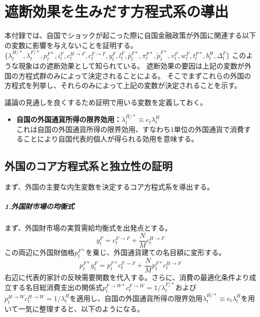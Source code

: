 
\chapter{遮断効果を生みだす方程式系の導出}
\label{chap:appendix_insulation_effect}

本付録では、自国でショックが起こった際に自国金融政策が外国に関連する以下の変数に影響を与えないことを証明する。
\(\{\lambda_t^{H/*},\lambda_t^{F/*},p_t^{F*},i_t^F,c_t^{H\to F},c_t^{F\to F},y_t^F,l_t^F,\bar{p}_t^{F*},\pi_t^{F*},\widetilde{p}_t^{F*},v_t^F,w_t^F,t_t^{F*},b_t^H,\Delta_t^F\}\)
このような現象は\textcite{ColeObstfeld1991}の遮断効果として知られている。
遮断効果の要因は上記の変数が外国の方程式群のみによって決定されることによる。
そこでまずこれらの外国の方程式を列挙し、それらのみによって上記の変数が決定されることを示す。

議論の見通しを良くするため証明で用いる変数を定義しておく。
\begin{itemize}
    \item\label{itm:appendix_insulation_effect_def_lambda_star} \textbf{自国の外国通貨所得の限界効用：}\(\lambda_t^{H/*}\equiv e_t\lambda_t^H\)\\
    これは自国の外国通貨所得の限界効用、すなわち1単位の外国通貨で消費することにより自国代表的個人が得られる効用を意味する。
\end{itemize}

\section{外国のコア方程式系と独立性の証明}
\label{sec:appendix_insulation_effect_core}

まず、外国の主要な内生変数を決定するコア方程式系を導出する。



\paragraph{1.外国財市場の均衡式}
\label{sec:appendix_insulation_effect_core_market_clearing}

まず、外国財市場の実質需給均衡式を出発点とする。
\begin{equation}
y_t^F=c_t^{F\to F}+\frac{N}{M}c_t^{H\to F}
\label{eq:appendix_insulation_effect_core_market_clearing_real}
\end{equation}
この両辺に外国財価格\(p_t^{F*}\)を乗じ、外国通貨建ての名目額に変形する。
\begin{equation}
    p_t^{F*}y_t^F=p_t^{F*}c_t^{F\to F}+\frac{N}{M}p_t^{F*}c_t^{H\to F}
    \label{eq:appendix_insulation_effect_core_market_clearing_nom_step}
\end{equation}
右辺に代表的家計の反映需要関数を代入する。さらに、消費の最適化条件より成立する名目総消費支出の関係式\(p_t^{F\to W*}c_t^{F\to W}=1/\lambda_t^{F/*}\)および\(p_t^{H\to W}c_t^{H\to W}=1/\lambda_t^H\)を適用し、自国の外国通貨所得の限界効用\(\lambda_t^{H/*}\equiv e_t\lambda_t^H\)を用いて一気に整理すると、以下のようになる。

